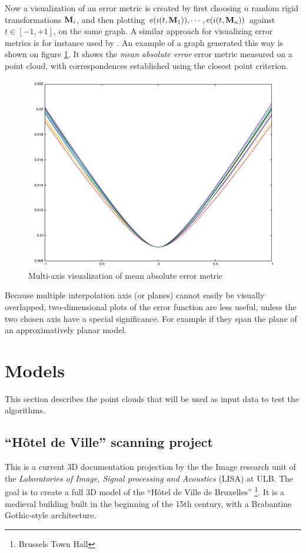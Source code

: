 Now a visualization of an error metric is created by first choosing $n$ random rigid transformations $\mathbf{M}_i$, and then plotting $e(i(t, \mathbf{M}_1)), \cdots, e(i(t, \mathbf{M}_n))$ against $t \in [-1, +1]$, on the same graph. A similar approach for visualizing error metrics is for instance used by \cite{Boua2013}. An example of a graph generated this way is shown on figure \ref{fig:mea_plot}. It shows the \emph{mean absolute error} error metric measured on a point cloud, with correspondences established using the closest point criterion.

\begin{figure}[h]
\centering
\includegraphics[width=.5\textwidth]{fig/mea_plot.pdf}
\caption{Multi-axis visualization of mean absolute error metric}
\label{fig:mea_plot}
\end{figure}

Because multiple interpolation axis (or planes) cannot easily be visually overlapped, two-dimensional plots of the error function are less useful, unless the two chosen axis have a special significance. For example if they span the plane of an approximatively planar model.


\newpage

\section{Models}
This section describes the point clouds that will be used as input data to test the algorithms.

\subsection{``Hôtel de Ville'' scanning project}
This is a current 3D documentation projection by the the Image research unit of the \emph{Laboratories of Image, Signal processing and Acoustics} (LISA) at ULB. The goal is to create a full 3D model of the ``Hôtel de Ville de Bruxelles'' \footnote{Brussels Town Hall}. It is a medieval building built in the beginning of the 15th century, with a Brabantine Gothic-style architecture.

